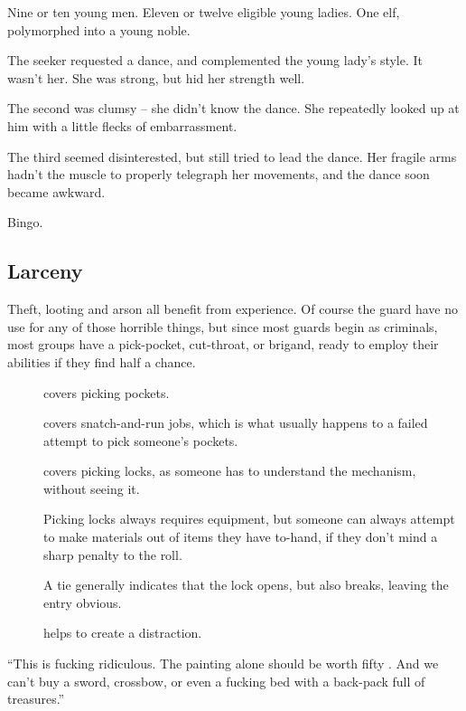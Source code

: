 \begin{multicols}{2}
\begin{exampletext}
  Nine or ten young men.
  Eleven or twelve eligible young ladies.
  One elf, polymorphed into a young noble.

  The \gls{seeker} requested a dance, and complemented the young lady's style.
  It wasn't her.
  She was strong, but hid her strength well.

  The second was clumsy -- she didn't know the dance.
  She repeatedly looked up at him with a little flecks of embarrassment.

  The third seemed disinterested, but still tried to lead the dance.
  Her fragile arms hadn't the muscle to properly telegraph her movements, and the dance soon became awkward.

  Bingo.
\end{exampletext}

\subsection{Larceny}

Theft, looting and arson all benefit from experience.
Of course the \gls{guard} have no use for any of those horrible things, but since most \glspl{guard} begin as criminals, most groups have a pick-pocket, cut-throat, or brigand, ready to employ their abilities if they find half a chance.

\begin{description}
  \item[]
    covers picking pockets.
  \item[]
    covers snatch-and-run jobs, which is what usually happens to a failed attempt to pick someone's pockets.
  \item[]
    covers picking locks, as someone has to understand the mechanism, without seeing it.

    Picking locks always requires equipment, but someone can always attempt to make materials out of items they have to-hand, if they don't mind a sharp penalty to the roll.

    A tie generally indicates that the lock opens, but also breaks, leaving the entry obvious.

  \item[]
    helps to create a distraction.
\end{description}

\begin{exampletext}
  ``This is fucking ridiculous.
  The painting alone should be worth fifty .
  And we can't buy a sword, crossbow, or even a fucking bed with a back-pack full of treasures.''


\end{exampletext}
\end{multicols}
